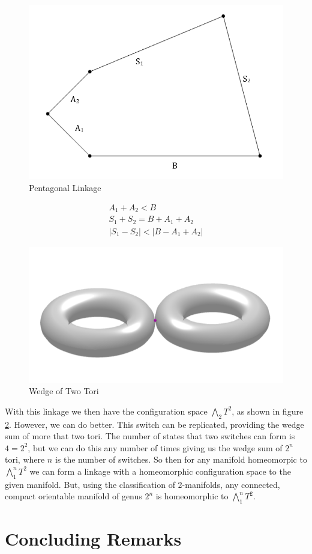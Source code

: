 \documentclass{article}
\begin{document}
\begin{figure}[h!]
\centering
\includegraphics[scale=0.3]{./images/labeled_pentagon.png}
\caption{Pentagonal Linkage}
\label{fig:The Labeled Pentagon}
\end{figure}

\begin{gather*}
A_1 + A_2 < B \\
S_1 + S_2 = B + A_1 + A_2 \\
|S_1 - S_2| < |B-A_1 +A_2|
\end{gather*}

\begin{figure}[h!]
\centering
\includegraphics[scale=0.5]{./images/two_tori.png}
\caption{Wedge of Two Tori}
\label{fig:Wedge of Two Tori}
\end{figure}

\noindent With this linkage we then have the configuration space $\bigwedge_2 T^2$, as shown in figure \ref{fig:Wedge of Two Tori}. However, we can do better. This switch can be replicated, providing the wedge sum of more that two tori. The number of states that two switches can form is $4 = 2^2$, but we can do this any number of times giving us the wedge sum of $2^n$ tori, where $n$ is the number of switches. So then for any manifold homeomorpic to $\bigwedge_1^n T^2$ we can form a linkage with a homeomorphic configuration space to the given manifold. But, using the classification of 2-manifolds, any connected, compact orientable manifold of genus $2^n$ is homeomorphic to $\bigwedge_1^n T^2$. 
 
\section{Concluding Remarks}



\end{document}
